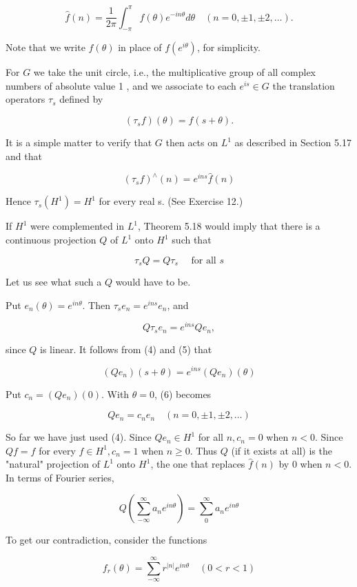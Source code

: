 \documentclass[10pt]{article}
\begin{document}
$$
\hat{f}(n)=\frac{1}{2 \pi} \int_{-\pi}^{\pi} f(\theta) e^{-i n \theta} d \theta \quad(n=0, \pm 1, \pm 2, \ldots) .
$$

Note that we write $f(\theta)$ in place of $f\left(e^{i \theta}\right)$, for simplicity.

For $G$ we take the unit circle, i.e., the multiplicative group of all complex numbers of absolute value 1 , and we associate to each $e^{i s} \in G$ the translation operators $\tau_{s}$ defined by

$$
\left(\tau_{s} f\right)(\theta)=f(s+\theta) .
$$

It is a simple matter to verify that $G$ then acts on $L^{1}$ as described in Section 5.17 and that

$$
\left(\tau_{s} f\right)^{\wedge}(n)=e^{i n s} \hat{f}(n)
$$

Hence $\tau_{s}\left(H^{1}\right)=H^{1}$ for every real s. (See Exercise 12.)

If $H^{1}$ were complemented in $L^{1}$, Theorem 5.18 would imply that there is a continuous projection $Q$ of $L^{1}$ onto $H^{1}$ such that

$$
\tau_{s} Q=Q \tau_{s} \quad \text { for all } s
$$

Let us see what such a $Q$ would have to be.

Put $e_{n}(\theta)=e^{i n \theta}$. Then $\tau_{s} e_{n}=e^{i n s} e_{n}$, and

$$
Q \tau_{s} e_{n}=e^{i n s} Q e_{n},
$$

since $Q$ is linear. It follows from (4) and (5) that

$$
\left(Q e_{n}\right)(s+\theta)=e^{i n s}\left(Q e_{n}\right)(\theta)
$$

Put $c_{n}=\left(Q e_{n}\right)(0)$. With $\theta=0$, (6) becomes

$$
Q e_{n}=c_{n} e_{n} \quad(n=0, \pm 1, \pm 2, \ldots)
$$

So far we have just used (4). Since $Q e_{n} \in H^{1}$ for all $n, c_{n}=0$ when $n<0$. Since $Q f=f$ for every $f \in H^{1}, c_{n}=1$ when $n \geq 0$. Thus $Q$ (if it exists at all) is the "natural" projection of $L^{1}$ onto $H^{1}$, the one that replaces $\hat{f}(n)$ by 0 when $n<0$. In terms of Fourier series,

$$
Q\left(\sum_{-\infty}^{\infty} a_{n} e^{i n \theta}\right)=\sum_{0}^{\infty} a_{n} e^{i n \theta}
$$

To get our contradiction, consider the functions

$$
f_{r}(\theta)=\sum_{-\infty}^{\infty} r^{|n|} e^{i n \theta} \quad(0<r<1)
$$
\end{document}
